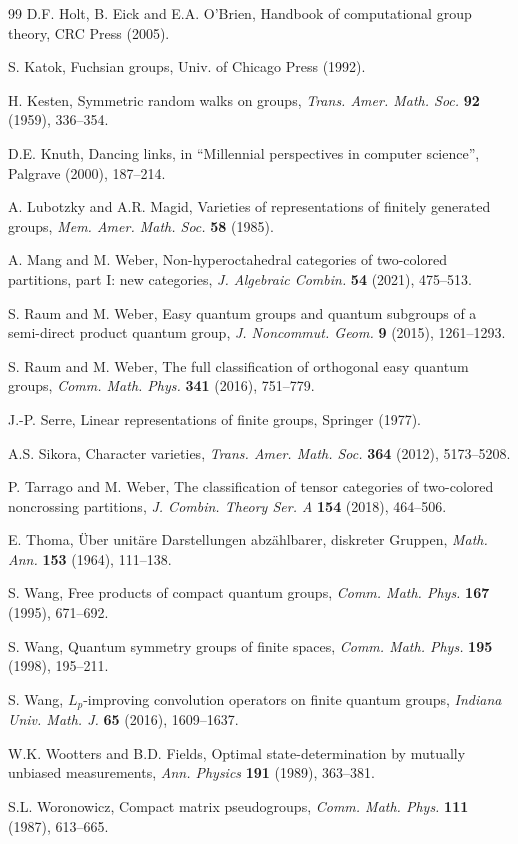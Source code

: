 \documentclass[12pt]{amsart}
\theoremstyle{definition}
\begin{document}
\begin{thebibliography}{99}
D.F. Holt, B. Eick and E.A. O'Brien, Handbook of computational group theory, CRC Press (2005).

S. Katok, Fuchsian groups, Univ. of Chicago Press (1992).

H. Kesten, Symmetric random walks on groups, {\em Trans. Amer. Math. Soc.} {\bf 92} (1959), 336--354.

D.E. Knuth, Dancing links, in ``Millennial perspectives in computer science'', Palgrave (2000), 187--214.

A. Lubotzky and A.R. Magid, Varieties of representations of finitely generated groups, {\em Mem. Amer. Math. Soc.} {\bf 58} (1985).

A. Mang and M. Weber, Non-hyperoctahedral categories of two-colored partitions, part I: new categories, {\em J. Algebraic Combin.} {\bf 54} (2021), 475--513.

S. Raum and M. Weber, Easy quantum groups and quantum subgroups of a semi-direct product quantum group, {\em J. Noncommut. Geom.} {\bf 9} (2015), 1261--1293.

S. Raum and M. Weber, The full classification of orthogonal easy quantum groups, {\em Comm. Math. Phys.} {\bf 341} (2016), 751--779.

J.-P. Serre, Linear representations of finite groups, Springer (1977).

A.S. Sikora, Character varieties, {\em Trans. Amer. Math. Soc.} {\bf 364} (2012), 5173--5208.

P. Tarrago and M. Weber, The classification of tensor categories of two-colored noncrossing partitions, {\em J. Combin. Theory Ser. A} {\bf 154} (2018), 464--506.

E. Thoma, \"Uber unit\"are Darstellungen abz\"ahlbarer, diskreter Gruppen, {\em Math. Ann.} {\bf 153} (1964), 111--138.

S. Wang, Free products of compact quantum groups, {\em Comm. Math. Phys.} {\bf 167} (1995), 671--692.

S. Wang, Quantum symmetry groups of finite spaces, {\em Comm. Math. Phys.} {\bf 195} (1998), 195--211.

S. Wang, $L_p$-improving convolution operators on finite quantum groups, {\em Indiana Univ. Math. J.} {\bf 65} (2016), 1609--1637.

W.K. Wootters and B.D. Fields, Optimal state-determination by mutually unbiased measurements, {\em Ann. Physics} {\bf 191} (1989), 363--381.

S.L. Woronowicz, Compact matrix pseudogroups, {\em Comm. Math. Phys.} {\bf 111} (1987), 613--665.

\end{thebibliography}
\end{document}
